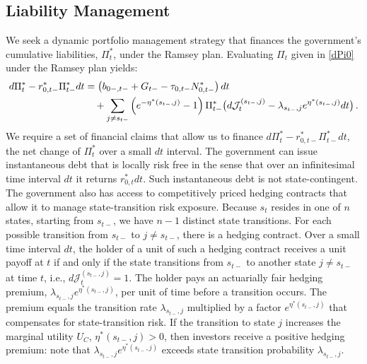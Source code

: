 \documentclass[12pt]{article}
\begin{document}
\subsection{Liability Management}\label{subsec:financing1}
We seek a  dynamic portfolio management strategy that finances the government's cumulative liabilities, $\Pi_t^\ast$, under the Ramsey plan. 
Evaluating	 $\Pi_t$ given in \eqref{dPi0} under the Ramsey plan yields: 
	\begin{align} \label{dPiast}
	d\Pi_t  ^\ast - 
	 r^{\ast}_{0, t-}\Pi_{t-}^\ast  dt 
&= \left(b_{0-, t-} + G_{t-} - \tau_{0, t-} N_{0, t-} ^\ast  \right)dt   \notag \\
	&\quad + \sum_{j\neq s_{t-}} \left(e^{-\eta^\ast (s_{t-}, j)} - 1 \right)\Pi_{t-} ^\ast 
	\big(d {\mathcal J}_t^{(s_{t-}, j)} 
	- \lambda_{s_{t-}, j} e^{\eta^\ast (s_{t-}, j)} dt \big) \, . 
	\end{align}
We require 
 a set of financial claims that allow us to finance $d\Pi_t  ^\ast - 
	 r^{\ast}_{0, t-}\Pi_{t-}^\ast  dt $, the net change of $\Pi_t  ^\ast$ over a small $dt$ interval. The government can issue  instantaneous debt that is locally risk free in the sense that   over an infinitesimal time interval $dt$ it returns %
$r^\ast_{0, t}dt$.  %
Such  instantaneous debt is  not state-contingent.  
The government also has access to competitively priced hedging contracts that allow it to manage  state-transition risk exposure. 
Because $s_t$ resides in one of  $n$ states, starting from $s_{t-}$, we have $n-1$ distinct state transitions. For each possible transition from $s_{t-}$ to $j\neq s_{t-}$,  there is a hedging contract. Over a small time interval  $dt$, the holder of a unit of such a  hedging contract receives a  unit  payoff at $t$ if and only if the state transitions from $s_{t-}$ to another state $j\neq s_{t-}$ at time $t$, i.e., $d {\mathcal J}_t^{(s_{t-}, j)}=1$. The holder pays an actuarially fair hedging premium, $\lambda_{s_{t-}, j}e^{\eta^*(s_{t-}, j)}$,  per unit of time before a transition occurs. The premium equals the transition rate $\lambda_{s_{t-}, j}$ multiplied by a factor $e^{\eta^*(s_{t-}, j)}$ that compensates for  state-transition risk.  If the transition to state $j$ increases the marginal utility $U_C$, $\eta^*(s_{t-}, j)>0$, then investors receive  a positive hedging premium: note that $\lambda_{s_{t-}, j}e^{\eta^*(s_{t-}, j)}$ exceeds  state transition probability $\lambda_{s_{t-}, j}$. 
\end{document}
